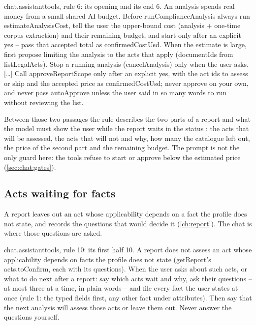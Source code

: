 \begin{promptexcerpt}{chat.assistant}{tools, rule 6: its opening and its end}
6. An analysis spends real money from a small shared AI budget. Before runComplianceAnalysis always run estimateAnalysisCost, tell the user the upper-bound cost (analysis + one-time corpus extraction) and their remaining budget, and start only after an explicit yes – pass that accepted total as confirmedCostUsd. When the estimate is large, first propose limiting the analysis to the acts that apply (documentIds from listLegalActs). Stop a running analysis (cancelAnalysis) only when the user asks.
[…]
Call approveReportScope only after an explicit yes, with the act ids to assess or skip and the accepted price as confirmedCostUsd; never approve on your own, and never pass autoApprove unless the user said in so many words to run without reviewing the list.
\end{promptexcerpt}

Between those two passages the rule describes the two parts of a report and what the model must
show the user while the report waits in the status : the acts that will be
assessed, the acts that will not and why, how many the catalogue left out, the price of the
second part and the remaining budget. The prompt is not the only guard here: the tools refuse
to start or approve below the estimated price (\cref{sec:chat:gates}).

\subsection{Acts waiting for facts}

A report leaves out an act whose applicability depends on a fact the profile does not state,
and records the questions that would decide it (\cref{ch:report}). The chat is where those
questions are asked.

\begin{promptexcerpt}{chat.assistant}{tools, rule 10: its first half}
10. A report does not assess an act whose applicability depends on facts the profile does not state (getReport's acts.toConfirm, each with its questions). When the user asks about such acts, or what to do next after a report: say which acts wait and why, ask their questions – at most three at a time, in plain words – and file every fact the user states at once (rule 1: the typed fields first, any other fact under attributes). Then say that the next analysis will assess those acts or leave them out. Never answer the questions yourself.
\end{promptexcerpt}


